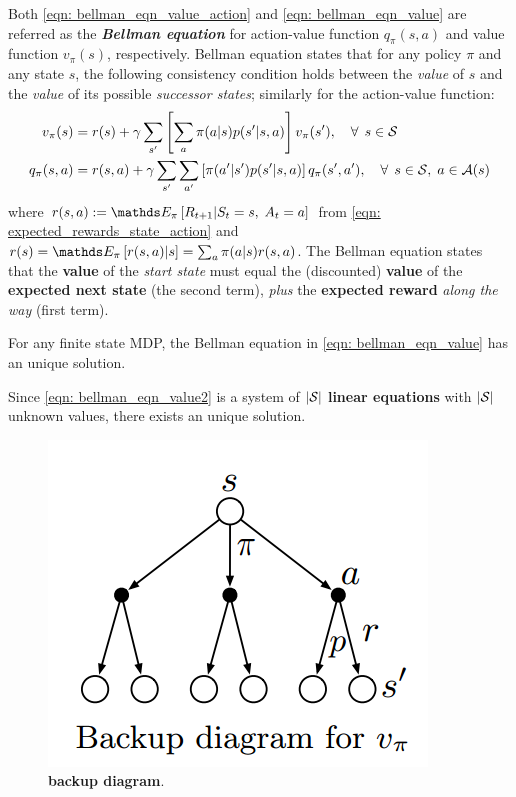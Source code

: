 \documentclass[11pt]{article}
\begin{document}
Both \eqref{eqn: bellman_eqn_value_action} and \eqref{eqn: bellman_eqn_value} are referred as the \emph{\textbf{Bellman equation}} for  action-value function $q_{\pi}(s, a)$ and value function  $v_{\pi}(s)$, respectively. Bellman equation states that for any policy $\pi$ and any state $s$, the following consistency condition holds between the \emph{value} of $s$ and the \emph{value} of its possible \emph{successor states}; similarly for the action-value function:
\begin{align}
v_{\pi}(s) &= r(s) + \gamma \sum_{s'}\left[\sum_{a}\pi(a|s)p(s'| s, a)\right]v_{\pi}(s'), \quad \forall\,\; s\in {\mathcal S} \label{eqn: bellman_eqn_value3}\\
q_{\pi}(s, a) &=  r(s,a) + \gamma\sum_{s'}\sum_{a'}\left[\pi(a'|s')p(s'|s,a)\right]q_{\pi}(s', a'), \quad \forall\,\; s\in {\mathcal S}, \; a\in {\mathcal A}(s) \label{eqn: bellman_eqn_value_action2}
\end{align} where $r(s,a) := \E{\pi}{R_{t+1} | S_{t} = s, \;A_{t}=a}$ from \eqref{eqn: expected_rewards_state_action} and $r(s) =  \E{\pi}{r(s,a)| s} = \sum_{a}\pi(a|s)r(s,a)$. The Bellman equation states that the \textbf{value} of the \emph{start state} must equal the (discounted) \textbf{value} of the \textbf{expected next state} (the second term), \emph{plus} the \textbf{expected reward} \emph{along the way} (first term). 

\begin{theorem}
For any finite state MDP, the Bellman equation in \eqref{eqn: bellman_eqn_value} has an unique solution.
\end{theorem}  Since \eqref{eqn: bellman_eqn_value2} is a system of $|{\mathcal S}|$ \textbf{linear equations} with $|{\mathcal S}|$ unknown values, there exists an unique solution. 

\begin{figure}
\begin{minipage}[t]{1\linewidth}
  \centering
  \centerline{\includegraphics[scale = 0.3]{backup_diagram.png}}
\end{minipage}
\caption{\footnotesize{\textbf{backup diagram}.  \citep{sutton2018reinforcement}}}
\label{fig: backup_diagram}
\end{figure}
\end{document}
